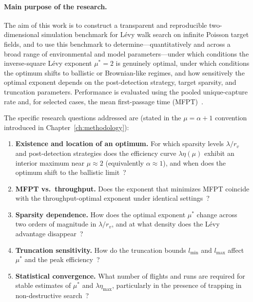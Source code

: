 \paragraph{Main purpose of the research.}
The aim of this work is to construct a transparent and reproducible two-dimensional simulation benchmark for L\'evy walk search on infinite Poisson target fields, and to use this benchmark to determine---quantitatively and across a broad range of environmental and model parameters---under which conditions the inverse-square L\'evy exponent $\mu^* = 2$ is genuinely optimal, under which conditions the optimum shifts to ballistic or Brownian-like regimes, and how sensitively the optimal exponent depends on the post-detection strategy, target sparsity, and truncation parameters. Performance is evaluated using the pooled unique-capture rate and, for selected cases, the mean first-passage time (MFPT)~\cite{bartumeus2002optimizing,viswanathan1999optimizing}.

The specific research questions addressed are (stated in the
$\mu = \alpha + 1$ convention introduced in
Chapter~\ref{ch:methodology}):\label{sec:research_questions}
\begin{enumerate}
    \item \textbf{Existence and location of an optimum.}
    For which sparsity levels $\lambda/r_v$ and post-detection strategies does the efficiency curve $\lambda\eta(\mu)$ exhibit an interior maximum near $\mu \approx 2$ (equivalently $\alpha \approx 1$), and when does the optimum shift to the ballistic limit~\cite{buldyrev2021comment,levernier2020inverse}?
    \item \textbf{MFPT vs.\ throughput.}
    Does the exponent that minimizes MFPT coincide with the throughput-optimal exponent under identical settings~\cite{bartumeus2002optimizing,raposo2003dynamical}?
    \item \textbf{Sparsity dependence.}
    How does the optimal exponent $\mu^*$ change across two orders of magnitude in $\lambda/r_v$, and at what density does the L\'evy advantage disappear~\cite{bartumeus2005animal}?
    \item \textbf{Truncation sensitivity.}
    How do the truncation bounds $l_{\min}$ and $l_{\max}$ affect $\mu^*$ and the peak efficiency~\cite{chen2018tempered}?
    \item \textbf{Statistical convergence.}
    What number of flights and runs are required for stable estimates of $\mu^*$ and $\lambda\eta_{\max}$, particularly in the presence of trapping in non-destructive search~\cite{edwards2007revisiting,james2011assessing}?
\end{enumerate}

